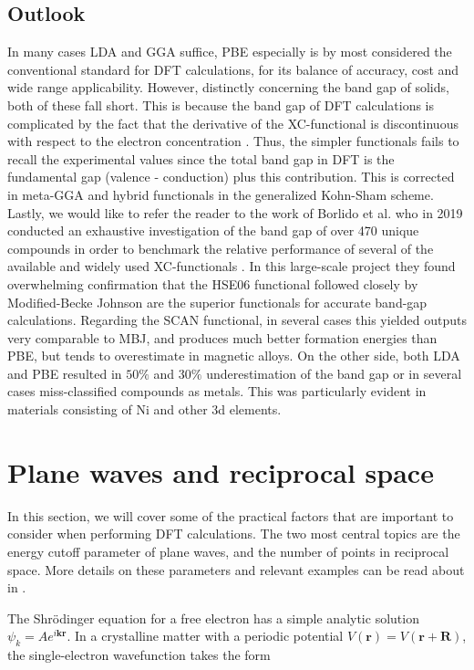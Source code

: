 \subsection{Outlook} 
 
In many cases LDA and GGA suffice, PBE especially is by most considered the conventional standard for DFT calculations, for its balance of accuracy, cost and wide range applicability. However, distinctly concerning the band gap of solids, both of these fall short. This is because the band gap of DFT calculations is complicated by the fact that the derivative of the XC-functional is discontinuous with respect to the electron concentration \cite{xc_derivative}. Thus, the simpler functionals fails to recall the experimental values since the total band gap in DFT is the fundamental gap (valence - conduction) plus this contribution. This is corrected in meta-GGA and hybrid functionals in the generalized Kohn-Sham scheme. Lastly, we would like to refer the reader to the work of Borlido et al. who in 2019 conducted an exhaustive investigation of the band gap of over 470 unique compounds in order to benchmark the relative performance of several of the available and widely used XC-functionals \cite{xc_benchmark}. In this large-scale project they found overwhelming confirmation that the HSE06 functional followed closely by Modified-Becke Johnson are the superior functionals for accurate band-gap calculations. Regarding the SCAN functional, in several cases this yielded outputs very comparable to MBJ, and produces much better formation energies than PBE, but tends to overestimate in magnetic alloys. On the other side, both LDA and PBE resulted in $50\%$ and $30\%$ underestimation of the band gap or in several cases miss-classified compounds as metals. This was particularly evident in materials consisting of Ni and other 3d elements.  
 

\section{Plane waves and reciprocal space}
In this section, we will cover some of the practical factors that are important to consider when performing DFT calculations. The two most central topics are the energy cutoff parameter of plane waves, and the number of points in reciprocal space. More details on these parameters and relevant examples can be read about in \cite{Sholl2009}. 
 
The Shr\"{o}dinger equation for a free electron has a simple analytic solution $\psi_k = Ae^{i\boldsymbol{k}\boldsymbol{r}}$. In a crystalline matter with a periodic potential $V(\boldsymbol{r}) = V(\boldsymbol{r} + \boldsymbol{R})$, the single-electron wavefunction takes the form 

